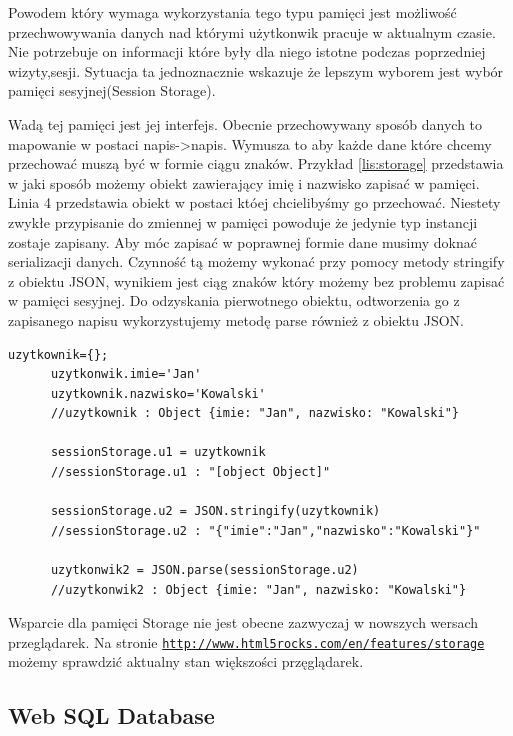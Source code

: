 Powodem który wymaga wykorzystania tego typu pamięci jest możliwość przechwowywania danych nad którymi użytkonwik pracuje w aktualnym czasie. Nie potrzebuje on informacji które były dla niego istotne podczas poprzedniej wizyty,sesji. Sytuacja ta jednoznacznie wskazuje że lepszym wyborem jest wybór pamięci sesyjnej(Session Storage).


Wadą tej pamięci jest jej interfejs. Obecnie przechowywany sposób danych to mapowanie w postaci napis->napis. Wymusza to aby każde dane które chcemy przechować muszą być w formie ciągu znaków. Przykład \ref{lis:storage} przedstawia w jaki sposób możemy obiekt zawierający imię i nazwisko zapisać w pamięci. Linia 4 przedstawia obiekt w postaci któej chcielibyśmy go przechować. Niestety zwykłe przypisanie do zmiennej w pamięci powoduje że jedynie typ instancji zostaje zapisany. Aby móc zapisać w poprawnej formie dane musimy doknać serializacji danych. Czynność tą możemy wykonać przy pomocy metody stringify z obiektu JSON, wynikiem jest ciąg znaków który możemy bez problemu zapisać w pamięci sesyjnej. Do odzyskania pierwotnego obiektu, odtworzenia go z zapisanego napisu wykorzystujemy metodę parse również z obiektu JSON.

\lstset{language=JavaScript}
\label{lis:storage}
\begin{lstlisting}[caption=json]
      uzytkownik={};
      uzytkonwik.imie='Jan'
      uzytkownik.nazwisko='Kowalski'
      //uzytkownik : Object {imie: "Jan", nazwisko: "Kowalski"}
      
      sessionStorage.u1 = uzytkownik
      //sessionStorage.u1 : "[object Object]"
      
      sessionStorage.u2 = JSON.stringify(uzytkownik)
      //sessionStorage.u2 : "{"imie":"Jan","nazwisko":"Kowalski"}"
      
      uzytkonwik2 = JSON.parse(sessionStorage.u2)
      //uzytkonwik2 : Object {imie: "Jan", nazwisko: "Kowalski"}
\end{lstlisting}



Wsparcie dla pamięci Storage nie jest obecne zazwyczaj w nowszych wersach przeglądarek. Na stronie \underline{\texttt{http://www.html5rocks.com/en/features/storage}} możemy sprawdzić aktualny stan większości przęglądarek.

\subsection{Web SQL Database}
\label{subsec:websql}

